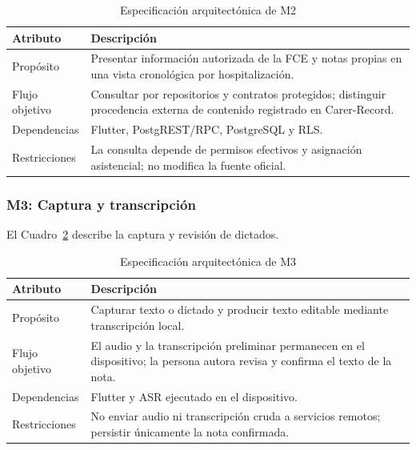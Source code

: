 \begin{table}[H]
    \caption{Especificación arquitectónica de M2}
    \label{tab:modulo_m2}
    \begin{tabularx}{\textwidth}{|l|X|}
        \hline
        \textbf{Atributo} & \textbf{Descripción} \\
        \hline
        Propósito & Presentar información autorizada de la FCE y notas propias en una vista cronológica por hospitalización. \\
        \hline
        Flujo objetivo & Consultar por repositorios y contratos protegidos; distinguir procedencia externa de contenido registrado en Carer-Record. \\
        \hline
        Dependencias & Flutter, PostgREST/RPC, PostgreSQL y RLS. \\
        \hline
        Restricciones & La consulta depende de permisos efectivos y asignación asistencial; no modifica la fuente oficial. \\
        \hline
    \end{tabularx}
\end{table}

\subsubsection*{M3: Captura y transcripción}

El Cuadro~\ref{tab:modulo_m3} describe la captura y revisión de dictados.

\begin{table}[H]
    \caption{Especificación arquitectónica de M3}
    \label{tab:modulo_m3}
    \begin{tabularx}{\textwidth}{|l|X|}
        \hline
        \textbf{Atributo} & \textbf{Descripción} \\
        \hline
        Propósito & Capturar texto o dictado y producir texto editable mediante transcripción local. \\
        \hline
        Flujo objetivo & El audio y la transcripción preliminar permanecen en el dispositivo; la persona autora revisa y confirma el texto de la nota. \\
        \hline
        Dependencias & Flutter y ASR ejecutado en el dispositivo. \\
        \hline
        Restricciones & No enviar audio ni transcripción cruda a servicios remotos; persistir únicamente la nota confirmada. \\
        \hline
    \end{tabularx}
\end{table}


